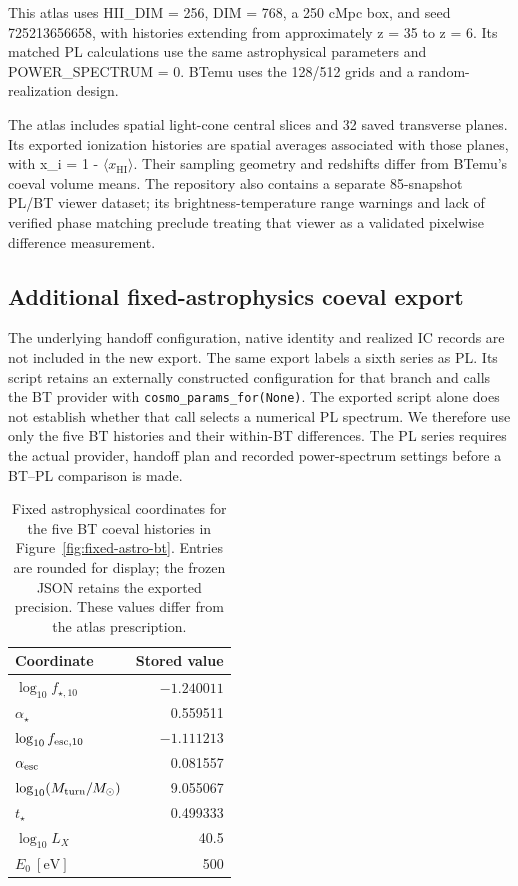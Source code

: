 This atlas uses HII\_DIM = 256, DIM = 768, a 250 cMpc box, and seed 725213656658, with histories extending from approximately z = 35 to z = 6. Its matched PL calculations use the same astrophysical parameters and POWER\_SPECTRUM = 0. BTemu uses the 128/512 grids and a random-realization design.

The atlas includes spatial light-cone central slices and 32 saved transverse planes. Its exported ionization histories are spatial averages associated with those planes, with x\_i = 1 - \(\langle\)\ensuremath{x_{\mathrm{HI}}}\(\rangle\). Their sampling geometry and redshifts differ from BTemu's coeval volume means. The repository also contains a separate 85-snapshot PL/BT viewer dataset; its brightness-temperature range warnings and lack of verified phase matching preclude treating that viewer as a validated pixelwise difference measurement.

\subsection{Additional fixed-astrophysics coeval export}\label{app:fixed-astro-update}

The underlying handoff configuration, native identity and realized IC records are not included in the new export. The same export labels a sixth series as PL. Its script retains an externally constructed configuration for that branch and calls the BT provider with \texttt{cosmo\_params\_for(None)}. The exported script alone does not establish whether that call selects a numerical PL spectrum. We therefore use only the five BT histories and their within-BT differences. The PL series requires the actual provider, handoff plan and recorded power-spectrum settings before a BT--PL comparison is made.

\begin{table}[t]\centering\small
\caption{Fixed astrophysical coordinates for the five BT coeval histories in Figure~\ref{fig:fixed-astro-bt}. Entries are rounded for display; the frozen JSON retains the exported precision. These values differ from the atlas prescription.}\label{tab:fixed-astro-update}
\begin{tabular}{lr}\toprule
Coordinate & Stored value\\\midrule
$\log_{10}f_{\star,10}$ & $-1.240011$\\
$\alpha_\star$ & 0.559511\\
$\log_{10}f_{{\rm esc},10}$ & $-1.111213$\\
$\alpha_{\rm esc}$ & 0.081557\\
$\log_{10}(M_{\rm turn}/M_\odot)$ & 9.055067\\
$t_\star$ & 0.499333\\
$\log_{10}L_X$ & 40.5\\
$E_0\ [\mathrm{eV}]$ & 500\\\bottomrule
\end{tabular}\end{table}

